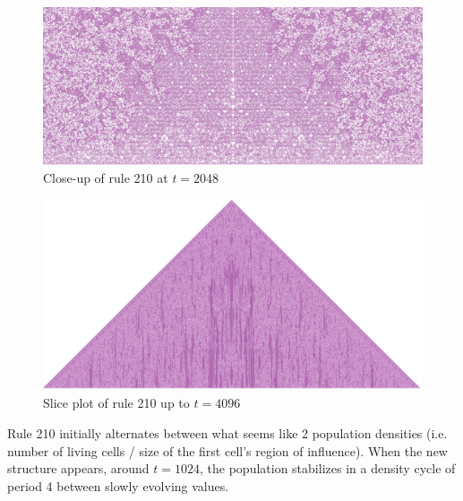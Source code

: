 \documentclass{article}
\begin{document}
\begin{figure}[H]
    \centering
    \includegraphics[width=\textwidth]{graphics/behavior/rule-210/rule-210-time-2048-close-up.jpg}
    \vspace{-16pt}
    \caption{Close-up of rule 210 at $t=2048$}
    \label{fig:rule-210-close-up-2048}
\end{figure}
\vspace{-16pt}
\begin{figure}[H]
    \centering
    \includegraphics[width=.9\textwidth]{graphics/behavior/rule-210/rule-210-slice-4096.jpg}
    \vspace{-10pt}
    \caption{Slice plot of rule 210 up to $t=4096$}
    \label{fig:rule-210-slice-2816}
\end{figure}

\noindent Rule 210 initially alternates between what seems like 2 population densities (i.e. number of living cells / size of the first cell's region of influence). When the new structure appears, around $t=1024$, the population stabilizes in a density cycle of period 4 between slowly evolving values.
\end{document}
